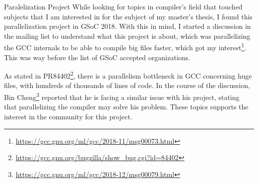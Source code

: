 \documentclass[12pt]{article}
\begin{document}
\begin{section}{Paralelization Project}
While looking for topics in compiler's field that touched subjects that I
am interested in for the subject of my master's thesis, I found this
parallelization project in GSoC 2018. With this in mind, I started a
discussion in the mailing list to understand what this project is about,
which was parallelizing the GCC internals to be able to compile big files
faster, which got my
interest\footnote{\url{https://gcc.gnu.org/ml/gcc/2018-11/msg00073.html}}.
This was way before the list of GSoC accepted organizations.

As stated in PR84402\footnote{\url{https://gcc.gnu.org/bugzilla/show\_bug.cgi?id=84402}},
there is a parallelism bottleneck in GCC concerning huge files, with hundreds of
thousands of lines of code. In the course of the discussion,
Bin Cheng\footnote{\url{https://gcc.gnu.org/ml/gcc/2018-12/msg00079.html}}
reported that
he is facing a similar issue with his project, stating that parallelizing the
compiler may solve his problem. These topics supports the interest in the
community for this project.

\end{section}
\end{document}
